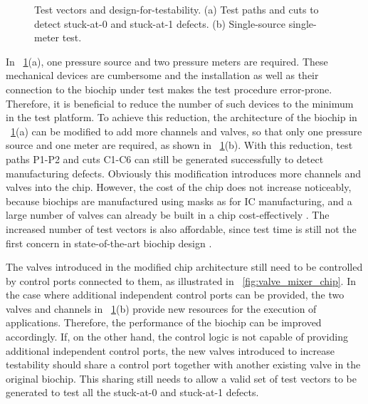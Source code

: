 \begin{figure}
\figurefontsize
\centering

\caption{Test vectors and design-for-testability.  
  (a) Test paths and cuts to detect stuck-at-0 and stuck-at-1
  defects. 
  (b) Single-source single-meter test.}
\label{fig:multiPortSingPort}
\end{figure}

In \figname~\ref{fig:multiPortSingPort}(a), one pressure source and two
pressure meters are required. These mechanical devices are cumbersome and the
installation as well as their connection to the biochip under test makes the
test procedure error-prone. Therefore, it is beneficial to reduce the number of
such devices to the minimum in the test platform.  To achieve this reduction,
the architecture of the biochip in \figname~\ref{fig:multiPortSingPort}(a) can
be modified to add more channels and valves, so that only one pressure source and
one meter are required, as shown in \figname~\ref{fig:multiPortSingPort}(b).
With this reduction, test paths P1-P2 and cuts C1-C6 can still be generated
successfully to detect manufacturing defects. Obviously this modification
introduces more channels and valves into the chip. However, the cost of the
chip does not increase noticeably, because biochips are manufactured 
using masks as for IC manufacturing, and a large number of valves can already
be built in a chip cost-effectively \cite{JEMP08}.
The increased number of test vectors is also affordable, since
test time is still not the first concern in  
state-of-the-art biochip design \cite{HuYHC14}.

The valves introduced in the modified chip architecture still need to be
controlled by control ports connected to them, as illustrated in
\figname~\ref{fig:valve_mixer_chip}. In the case where additional independent
control ports can be provided,
the two valves and channels in \figname~\ref{fig:multiPortSingPort}(b)
provide new resources for the execution of applications. Therefore, the
performance of the biochip can be improved accordingly. If, on the other hand,
the control logic is not capable of providing additional independent control
ports, the new valves introduced to increase testability should share a control
port together with another existing valve in the original biochip. This
sharing still needs to allow a valid set of test vectors to be generated to
test all the stuck-at-0 and stuck-at-1 defects.

